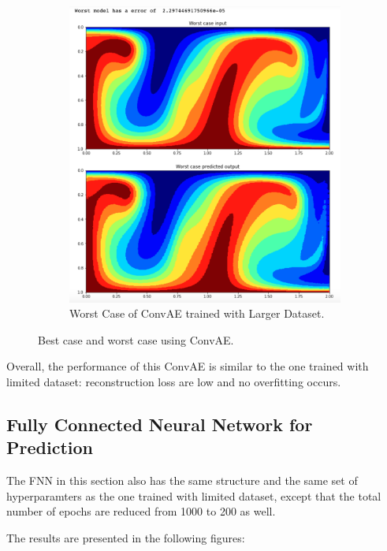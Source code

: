 \begin{figure}[H]
\begin{subfigure}{0.45\textwidth}
    \includegraphics[width=\textwidth]{figures/mantle_convection_images/larger_dataset/ConvAE_Worst.png}
    \caption{Worst Case of ConvAE trained with Larger Dataset.}
\end{subfigure}
        
\caption{Best case and worst case using ConvAE.}
\end{figure}

Overall, the performance of this ConvAE is similar to the one trained with limited dataset: reconstruction loss are low and no overfitting occurs.


\subsection{Fully Connected Neural Network for Prediction}

The FNN in this section also has the same structure and the same set of hyperparamters as the one trained with limited dataset, except that the total number of epochs are reduced from 1000 to 200 as well.

The results are presented in the following figures:

